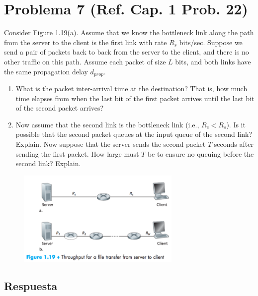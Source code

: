 \documentclass[10pt,spanish]{article}
\numberwithin{figure}{section} %
\begin{document}
\section[Problema 7]{Problema 7 \textnormal{\Large{(Ref. Cap. 1 Prob. 22)}}}

Consider Figure 1.19(a). Assume that we know the bottleneck link along the path from the server to the client is the first link with rate $R_s$ bits/sec. Suppose we send a pair of packets back to back from the server to the client, and there is no other traffic on this path. Assume each packet of size $L$ bits, and both links have the same propagation delay $d_{prop}$.

\begin{enumerate}
\item What is the packet inter-arrival time at the destination? That is, how much time elapses from when the last bit of the first packet arrives until the last bit of the second packet arrives?
\item Now assume that the second link is the bottleneck link (i.e., $R_c < R_s$). Is it possible that the second packet queues at the input queue of the second link? Explain. Now suppose that the server sends the second packet $T$ seconds after sending the first packet. How large must $T$ be to ensure no queuing before the second link? Explain.
\end{enumerate}
\begin{figure}[H]
\centering
\includegraphics[width=0.7\textwidth]{Practico1/Fig1-19.png}
\end{figure}

\subsection*{Respuesta}
\end{document}
